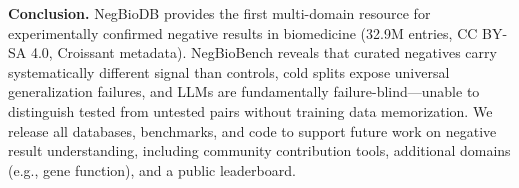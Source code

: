 \textbf{Conclusion.}
NegBioDB provides the first multi-domain resource for experimentally confirmed negative results in biomedicine (32.9M entries, CC BY-SA 4.0, Croissant metadata). NegBioBench reveals that curated negatives carry systematically different signal than controls, cold splits expose universal generalization failures, and LLMs are fundamentally failure-blind---unable to distinguish tested from untested pairs without training data memorization. We release all databases, benchmarks, and code to support future work on negative result understanding, including community contribution tools, additional domains (e.g., gene function), and a public leaderboard.
